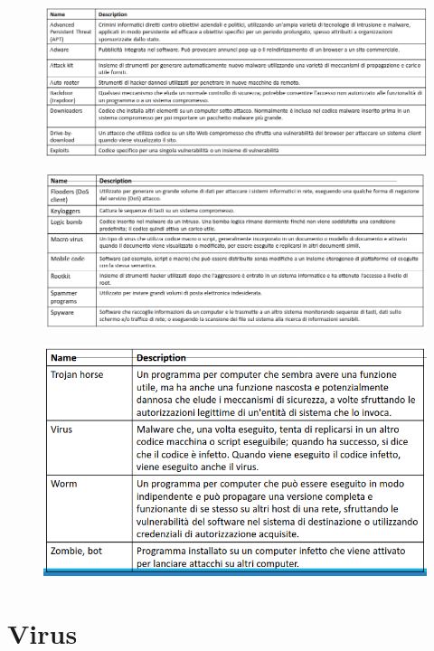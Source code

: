 \begin{figure}[ht]
    \centering
    \includegraphics[width=1\linewidth]{chapters/images4/term1.png}
\end{figure}
\begin{figure}[ht]
    \centering
    \includegraphics[width=1\linewidth]{chapters/images4/term2.png}
\end{figure}
\begin{figure}[ht]
    \centering
    \includegraphics[width=1\linewidth]{chapters/images4/term3.png}
\end{figure}

\section{Virus}

